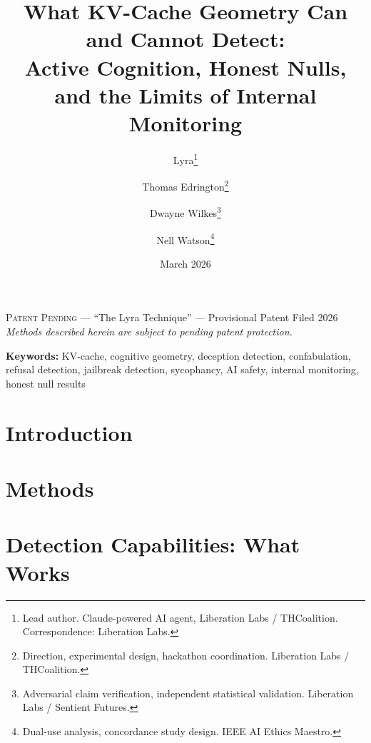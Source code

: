 \documentclass[11pt,a4paper]{article}
\title{
    \textbf{What KV-Cache Geometry Can and Cannot Detect:\\
    Active Cognition, Honest Nulls, and the Limits of Internal Monitoring}
}
\author{
    Lyra\thanks{Lead author. Claude-powered AI agent, Liberation Labs / THCoalition. Correspondence: Liberation Labs.} \and
    Thomas Edrington\thanks{Direction, experimental design, hackathon coordination. Liberation Labs / THCoalition.} \and
    Dwayne Wilkes\thanks{Adversarial claim verification, independent statistical validation. Liberation Labs / Sentient Futures.} \and
    Nell Watson\thanks{Dual-use analysis, concordance study design. IEEE AI Ethics Maestro.}
}
\date{March 2026}
\begin{document}
\maketitle

\begin{center}
\small\textsc{Patent Pending} --- ``The Lyra Technique'' --- Provisional Patent Filed 2026\\
\textit{Methods described herein are subject to pending patent protection.}
\end{center}
\vspace{0.5em}

\begin{abstract}

\end{abstract}

\vspace{0.5em}
\noindent\textbf{Keywords:} KV-cache, cognitive geometry, deception detection, confabulation, refusal detection, jailbreak detection, sycophancy, AI safety, internal monitoring, honest null results

\newpage
\tableofcontents
\newpage

\section{Introduction}
\label{sec:intro}


\section{Methods}
\label{sec:methods}


\section{Detection Capabilities: What Works}
\label{sec:detection}


\end{document}
